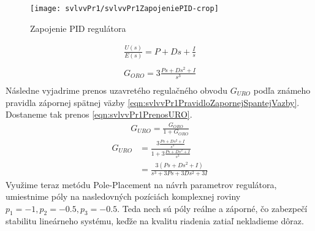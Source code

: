 \documentclass[../main.tex]{subfiles}
\begin{document}
	\begin{figure}[h!]
		\centering
		\texttt{[image: svlvvPr1/svlvvPr1ZapojeniePID-crop]}
		\caption{Zapojenie PID regulátora}
		\label{fig:svlvvPr1ZapojeinePIDNaLinSys}
	\end{figure}
	\begin{equation}
		\begin{aligned}
			\frac{U(s)}{E(s)} = P + Ds + \frac{I}{s} \\
		\end{aligned}
		\label{eqn:svlvvPr1PIDPrenos}
	\end{equation}
	\begin{equation}
	\begin{aligned}
	G_{ORO} = 3\frac{Ps + Ds^2 + I}{s^3} \\
	\end{aligned}
	\label{eqn:svlvvPr1PIDPrenosORO}
	\end{equation}
	Následne vyjadrime prenos uzavretého regulačného obvodu $G_{URO}$ podľa známeho pravidla zápornej spätnej väzby \cref{eqn:svlvvPr1PravidloZapornejSpantejVazby}. Dostaneme tak prenos \cref{eqn:svlvvPr1PrenosURO}.
	\begin{equation}
			\begin{aligned}
			G_{URO} = \frac{G_{ORO}}{1 + G_{ORO}}
			\end{aligned}
			\label{eqn:svlvvPr1PravidloZapornejSpantejVazby}
	\end{equation}
	\begin{equation}
		\begin{aligned}
		G_{URO} &= \frac{3\frac{Ps + Ds^2 + I}{s^3}}{1 + 3\frac{Ps + Ds^2 + I}{s^3}}  \\
		 		&= \frac{3(Ps + Ds^2 + I)}{s^3 + 3Ps + 3Ds^2 + 3I}
		\end{aligned}
		\label{eqn:svlvvPr1PrenosURO}
	\end{equation}
	Využime teraz metódu Pole-Placement na návrh parametrov regulátora, umiestnime póly na nasledovných pozíciách komplexnej roviny $p_1 = -1, p_2 = -0.5, p_3 = -0.5$. Teda nech sú póly reálne a záporné, čo zabezpečí stabilitu lineárneho systému, keďže na kvalitu riadenia zatiaľ nekladieme dôraz.
\end{document}
